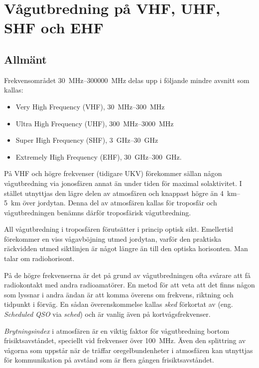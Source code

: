 \section[Vågutbredning på VHF-EHF]{Vågutbredning på VHF, UHF, SHF och EHF}
\label{vågutbredning_vhf}

\subsection{Allmänt}
Frekvensområdet \SIrange{30}{300000}{\mega\hertz} delas upp i följande mindre
avsnitt som kallas:

\begin{itemize}
  \item Very High Frequency (VHF), \SIrange{30}{300}{\mega\hertz}
  \item Ultra High Frequency (UHF), \SIrange{300}{3000}{\mega\hertz}
  \item Super High Frequency (SHF), \SIrange{3}{30}{\giga\hertz}
  \item Extremely High Frequency (EHF), \SIrange{30}{300}{\giga\hertz}.
\end{itemize}

På VHF och högre frekvenser (tidigare UKV) förekommer sällan någon
vågutbredning via jonosfären annat än under tiden för maximal solaktivitet.
I stället utnyttjas den lägre delen av atmosfären och
knappast högre än \SIrange{4}{5}{\kilo\metre} över jordytan.
Denna del av atmosfären kallas för troposfär och vågutbredningen benämns därför
troposfärisk vågutbredning.

All vågutbredning i troposfären förutsätter i princip optisk sikt.
Emellertid förekommer en viss vågavböjning utmed jordytan, varför den praktiska
räckvidden utmed siktlinjen är något längre än till den optiska horisonten.
Man talar om radiohorisont.

På de högre frekvenserna är det på grund av vågutbredningen ofta svårare att
få radiokontakt med andra radioamatörer.
En metod för att veta att det finns någon som lyssnar i andra ändan är att komma
överens om frekvens, riktning och tidpunkt i förväg.
En sådan överenskommelse kallas \emph{sked} förkortat av
(eng. \emph{Scheduled QSO} via \emph{sched}) och är vanlig även på
kortvågsfrekvenser.

\emph{Brytningsindex} i atmosfären är en viktig faktor för vågutbredning bortom
frisiktsavståndet, speciellt vid frekvenser över \SI{100}{\mega\hertz}.
Även den splittring av vågorna som uppstår när de träffar oregelbundenheter i
atmosfären kan utnyttjas för kommunikation på avstånd som är flera gången
frisiktsavståndet.

